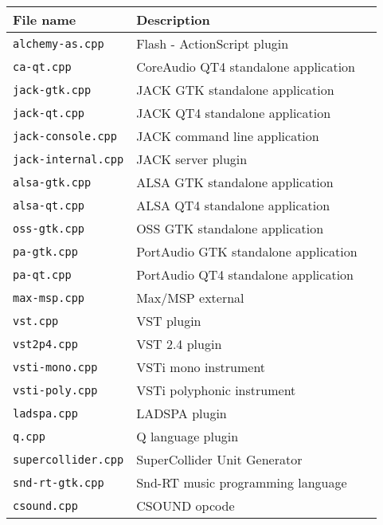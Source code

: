 \begin{table}[htp]
\begin{center}
\begin{tabular}{|l|l|l|}
\hline
\textbf{File name}		& \textbf{Description}   \\
\hline
\texttt{alchemy-as.cpp} 	& Flash - ActionScript plugin \\
\texttt{ca-qt.cpp} 		& CoreAudio QT4 standalone application  \\
\texttt{jack-gtk.cpp} 		& JACK GTK standalone application  \\
\texttt{jack-qt.cpp} 		& JACK QT4 standalone application  \\
\texttt{jack-console.cpp} 	& JACK command line application  \\
\texttt{jack-internal.cpp} 	& JACK server plugin  \\
\texttt{alsa-gtk.cpp} 		& ALSA GTK standalone application  \\
\texttt{alsa-qt.cpp} 		& ALSA QT4 standalone application  \\
\texttt{oss-gtk.cpp} 		& OSS GTK standalone application  \\
\texttt{pa-gtk.cpp} 		& PortAudio GTK standalone application  \\
\texttt{pa-qt.cpp} 		& PortAudio QT4 standalone application  \\
\hline
\texttt{max-msp.cpp} 	& Max/MSP external  \\
\texttt{vst.cpp} 			& VST plugin  \\
\texttt{vst2p4.cpp} 		& VST 2.4 plugin  \\
\texttt{vsti-mono.cpp} 	& VSTi mono instrument  \\
\texttt{vsti-poly.cpp} 		& VSTi polyphonic instrument  \\
\texttt{ladspa.cpp} 		& LADSPA plugin  \\
\texttt{q.cpp} 			& Q language plugin  \\
\texttt{supercollider.cpp} 	& SuperCollider Unit Generator  \\
\texttt{snd-rt-gtk.cpp} 	& Snd-RT music programming language  \\
\texttt{csound.cpp} 		& CSOUND opcode  \\

\end{tabular}
\end{center}
\end{table}
